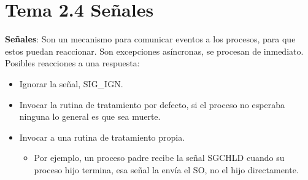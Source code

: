 \documentclass[12pt, twoside, openright]{report} %
\begin{document}
\section{Tema 2.4 Señales}

\textbf{Señales}: Son un mecanismo para comunicar eventos a los
  procesos, para que estos puedan reaccionar. Son excepciones
  asíncronas, se procesan de inmediato. Posibles reacciones a una
  respuesta:
  

  \begin{itemize}
  \item Ignorar la señal, SIG\_IGN.
    
  \item Invocar la rutina de tratamiento por defecto, si el proceso no
    esperaba ninguna lo general es que sea muerte.
    
  \item Invocar a una rutina de tratamiento propia.
    

    \begin{itemize}
    \item Por ejemplo, un proceso padre recibe la señal SGCHLD cuando su
      proceso hijo termina, esa señal la envía el SO, no el hijo
      directamente.
      
    \end{itemize}
  \end{itemize}
\end{document}
